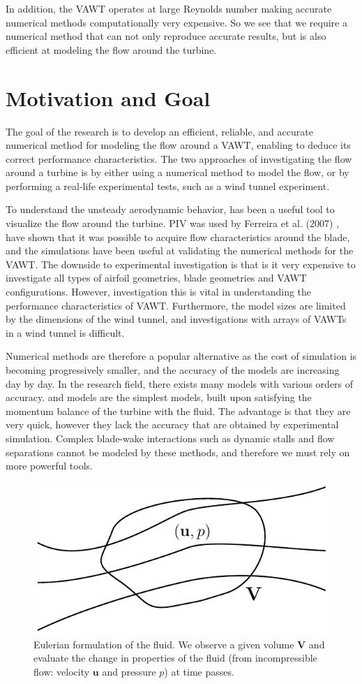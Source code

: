 In addition, the VAWT operates at large Reynolds number making accurate numerical methods computationally very expensive. So we see that we require a numerical method that can not only reproduce accurate results, but is also efficient at modeling the flow around the turbine.

\section{Motivation and Goal}
The goal of the research is to develop an efficient, reliable, and accurate numerical method for modeling the flow around a  VAWT, enabling to deduce its correct performance characteristics. The two approaches of investigating the flow around a turbine is by either using a numerical method to model the flow, or by performing a real-life experimental tests, such as a wind tunnel experiment.

To understand the unsteady aerodynamic behavior,  has been a useful tool to visualize the flow around the turbine. PIV was used by Ferreira et al. (2007) \cite{Ferreira2007}, have shown that it was possible to acquire flow characteristics around the blade, and the simulations have been useful at validating the numerical methods for the VAWT. The downside to experimental investigation is that is it very expensive to investigate all types of airfoil geometries, blade geometries and VAWT configurations. However, investigation this is vital in understanding the performance characteristics of VAWT. Furthermore, the model sizes are limited by the dimensions of the wind tunnel, and investigations with arrays of VAWTs in a wind tunnel is difficult.

Numerical methods are therefore a popular alternative as the cost of simulation is becoming progressively smaller, and the accuracy of the models are increasing day by day. In the research field, there exists many models with various orders of accuracy.  and  models are the simplest models, built upon satisfying the momentum balance of the turbine with the fluid. The advantage is that they are very quick, however they lack the accuracy that are obtained by experimental simulation. Complex blade-wake interactions such as dynamic stalls and flow separations cannot be modeled by these methods, and therefore we must rely on more powerful tools.

	\begin{figure}[!t]
		\centering
		\includegraphics[width=0.4\linewidth]{figures/introduction/eulerianRF.pdf}
		\caption{Eulerian formulation of the fluid. We observe a given volume $\mathbf{V}$ and evaluate the change in properties of the fluid (from incompressible flow: velocity $\mathbf{u}$ and pressure $p$) at time passes.}
		\label{fig:eulerianRF}
	\end{figure}

